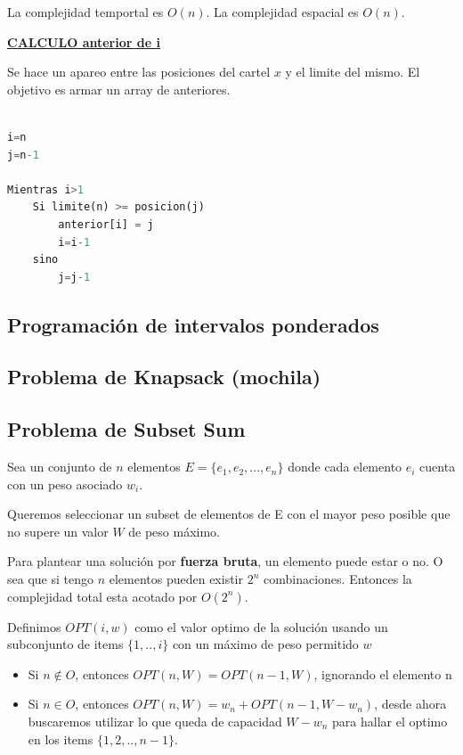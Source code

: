 \documentclass{article}
\begin{document}
La complejidad temportal es \(O(n)\). La complejidad espacial es \(O(n)\).



\noindent
\textbf{\underline{CALCULO anterior de i}}


Se hace un apareo entre las posiciones del cartel \(x\) y el limite del mismo. 
El objetivo es armar un array de anteriores.

\begin{lstlisting}[language=Python, caption=Solución iterativa]

i=n
j=n-1

Mientras i>1
    Si limite(n) >= posicion(j)
        anterior[i] = j
        i=i-1
    sino
        j=j-1

\end{lstlisting}


\newpage
\subsection{Programación de intervalos ponderados}


\newpage
\subsection{Problema de Knapsack (mochila) }

\newpage
\subsection{Problema de Subset Sum }

Sea un conjunto de \(n\) elementos \(E=\{e_1, e_2, ..., e_n \}\) donde cada elemento \(e_i\) 
cuenta con un peso asociado \(w_i\).

Queremos seleccionar un subset de elementos de E con el mayor peso posible que no supere un 
valor \(W\) de peso máximo.

Para plantear una solución por \textbf{fuerza bruta}, un elemento puede estar o no. O sea que si
tengo \(n\) elementos pueden existir \(2^n\) combinaciones. Entonces la complejidad total esta acotado
por \(O(2^n)\).

Definimos \(OPT(i, w)\) como el valor optimo de la solución usando un subconjunto de items \(\{1,..,i\}\)
con un máximo de peso permitido \(w\)

\begin{itemize}
    \item Si \(n \notin O\), entonces \(OPT(n,W) = OPT(n-1, W)\), ignorando el elemento n
    \item Si \(n \in O\), entonces \(OPT(n,W) = w_n + OPT(n-1, W-w_n)\), desde ahora buscaremos
            utilizar lo que queda de capacidad \(W-w_n\) para hallar el optimo en los items \(\{1,2,..,n-1\}\).

\end{itemize}
\end{document}
